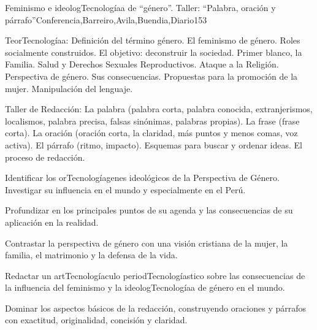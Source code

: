 \begin{syllabus}
\begin{unit}{Feminismo e ideologTecnologíaa de ``género''. Taller: ``Palabra, oración y párrafo''}{Conferencia,Barreiro,Avila,Buendia,Diario}{15}{3}
\begin{topics}
	\item TeorTecnologíaa: 
		\subitem Definición del término género. El feminismo de género. Roles socialmente construidos. El objetivo: deconstruir la sociedad. Primer blanco, la Familia. Salud y Derechos Sexuales Reproductivos. Ataque a la Religión.
		\subitem Perspectiva de género. Sus consecuencias. Propuestas para la promoción de la mujer.
		\subitem Manipulación del lenguaje.

	\item Taller de Redacción:
 		\subitem La palabra (palabra corta, palabra conocida, extranjerismos, localismos, palabra precisa, falsas sinónimas, palabras propias).
 		\subitem La frase (frase corta).
 		\subitem La oración (oración corta, la claridad, más puntos y menos comas, voz activa).
 		\subitem El párrafo (ritmo, impacto). 
 		\subitem Esquemas para buscar y ordenar ideas.
 		\subitem El proceso de redacción.
\end{topics}
\begin{unitgoals}
	\item Identificar los orTecnologíagenes ideológicos de la Perspectiva de Género. Investigar su influencia en el mundo y especialmente en el Perú. 	
	\item Profundizar en los principales puntos de su agenda y las consecuencias de su aplicación en la realidad. 	
	\item Contrastar la perspectiva de género con una visión cristiana de la mujer, la familia, el matrimonio y la defensa de la vida.
	\item Redactar un artTecnologíaculo periodTecnologíastico sobre las consecuencias de la influencia del feminismo y la ideologTecnologíaa de género en el mundo. 	
	\item Dominar los aspectos básicos de la redacción, construyendo oraciones y párrafos con exactitud, originalidad, concisión y claridad.

\end{unitgoals}
\end{unit}


\end{syllabus}
